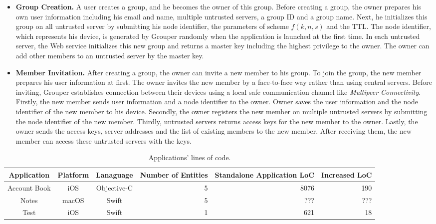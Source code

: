 \documentclass[twocolumn,10pt]{article}
\begin{document}
\begin{itemize}
	\setlength{\itemsep}{1pt}
	\setlength{\parskip}{0pt}
	\setlength{\parsep}{0pt}
	\item \textbf{Group Creation.}
	A user creates a group, and he becomes the owner of this group.  
	Before creating a group, the owner prepares his own user information including his email and name, multiple untrusted servers, a group ID and a group name. 
	Next, he initializes this group on all untrusted server by submitting his node identifier, the parameters of scheme $f(k, n, s)$ and the TTL. 
	The node identifier, which represents his device, is generated by Grouper randomly when the application is launched at the first time. 
	In each untrusted server, the Web service initializes this new group and returns a master key including the highest privilege to the owner. 
	The owner can add other members to an untrusted server by the master key.
	\item \textbf{Member Invitation.} 
	After creating a group, the owner can invite a new member to his group. 
	To join the group, the new member prepares his user information at first. 
	The owner invites the new member by a face-to-face way rather than using central servers. 
	Before inviting, Grouper establishes connection between their devices using a local safe communication channel like \emph{Multipeer Connectivity}\cite{mc}. 
	Firstly, the new member sends user information and a node identifier to the owner. 
	Owner saves the user information and the node identifier of the new member to his device. 
	Secondly, the owner registers the new member on multiple untrusted servers by submitting the node identifier of the new member. 
	Thirdly, untrusted servers returns access keys for the new member to the owner. 
	Lastly, the owner sends the access keys, server addresses and the list of existing members to the new member. 
	After receiving them, the new member can access these untrusted servers with the keys.
\end{itemize}

\begin{table}[t]
	\small
	\centering
	\caption{Applications' lines of code.}
	\label{my-label}
	\begin{tabular}{cccccc}
		\hline
		\textbf{Application} & \textbf{Platform} & \textbf{Lanaguage} & \textbf{Number of Entities} & \textbf{Standalone Application LoC} & \textbf{Increased LoC} \\ \hline
		Account Book & iOS & Objective-C & \multicolumn{1}{r}{5} & \multicolumn{1}{r}{8076} & \multicolumn{1}{r}{190} \\ 
		Notes & macOS & Swift & \multicolumn{1}{r}{5} & \multicolumn{1}{r}{???} & \multicolumn{1}{r}{???} \\
		Test & iOS & Swift & \multicolumn{1}{r}{1} & \multicolumn{1}{r}{621} & \multicolumn{1}{r}{18} \\  \hline 
	\end{tabular}
\end{table}
\end{document}
